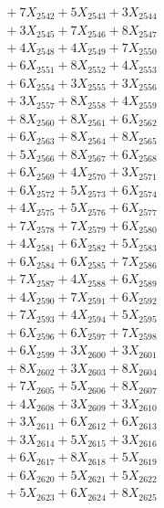 \documentclass[a4paper,10pt]{article}
\begin{document}
{\begin{align}
&\;  + 7 X_{2542} + 5 X_{2543} + 3 X_{2544} \\[0.3ex]
&\;  + 3 X_{2545} + 7 X_{2546} + 8 X_{2547} \\[0.3ex]
&\;  + 4 X_{2548} + 4 X_{2549} + 7 X_{2550} \\[0.3ex]
&\;  + 6 X_{2551} + 8 X_{2552} + 4 X_{2553} \\[0.3ex]
&\;  + 6 X_{2554} + 3 X_{2555} + 3 X_{2556} \\[0.3ex]
&\;  + 3 X_{2557} + 8 X_{2558} + 4 X_{2559} \\[0.5ex]\allowbreak
&\;  + 8 X_{2560} + 8 X_{2561} + 6 X_{2562} \\[0.3ex]
&\;  + 6 X_{2563} + 8 X_{2564} + 8 X_{2565} \\[0.3ex]
&\;  + 5 X_{2566} + 8 X_{2567} + 6 X_{2568} \\[0.3ex]
&\;  + 6 X_{2569} + 4 X_{2570} + 3 X_{2571} \\[0.3ex]
&\;  + 6 X_{2572} + 5 X_{2573} + 6 X_{2574} \\[0.3ex]
&\;  + 4 X_{2575} + 5 X_{2576} + 6 X_{2577} \\[0.3ex]
&\;  + 7 X_{2578} + 7 X_{2579} + 6 X_{2580} \\[0.3ex]
&\;  + 4 X_{2581} + 6 X_{2582} + 5 X_{2583} \\[0.3ex]
&\;  + 6 X_{2584} + 6 X_{2585} + 7 X_{2586} \\[0.3ex]
&\;  + 7 X_{2587} + 4 X_{2588} + 6 X_{2589} \\[0.5ex]\allowbreak
&\;  + 4 X_{2590} + 7 X_{2591} + 6 X_{2592} \\[0.3ex]
&\;  + 7 X_{2593} + 4 X_{2594} + 5 X_{2595} \\[0.3ex]
&\;  + 6 X_{2596} + 6 X_{2597} + 7 X_{2598} \\[0.3ex]
&\;  + 6 X_{2599} + 3 X_{2600} + 3 X_{2601} \\[0.3ex]
&\;  + 8 X_{2602} + 3 X_{2603} + 8 X_{2604} \\[0.3ex]
&\;  + 7 X_{2605} + 5 X_{2606} + 8 X_{2607} \\[0.3ex]
&\;  + 4 X_{2608} + 3 X_{2609} + 3 X_{2610} \\[0.3ex]
&\;  + 3 X_{2611} + 6 X_{2612} + 6 X_{2613} \\[0.3ex]
&\;  + 3 X_{2614} + 5 X_{2615} + 3 X_{2616} \\[0.3ex]
&\;  + 6 X_{2617} + 8 X_{2618} + 5 X_{2619} \\[0.5ex]\allowbreak
&\;  + 6 X_{2620} + 5 X_{2621} + 5 X_{2622} \\[0.3ex]
&\;  + 5 X_{2623} + 6 X_{2624} + 8 X_{2625} \\[0.3ex]

\end{align}}
\end{document}
